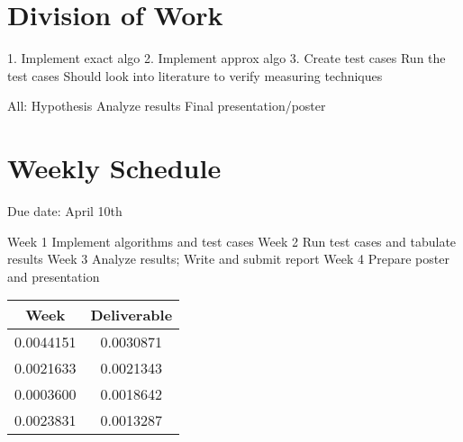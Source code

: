 \documentclass[letterpaper,12pt]{article}
\begin{document}
\section{Division of Work}

1. Implement exact algo
2. Implement approx algo
3. Create test cases
   Run the test cases
   Should look into literature to verify measuring techniques
   
 All: Hypothesis
      Analyze results
      Final presentation/poster      


\section{Weekly Schedule}
Due date: April 10th

Week 1 Implement algorithms and test cases
Week 2 Run test cases and tabulate results
Week 3 Analyze results; Write and submit report
Week 4 Prepare poster and presentation


\begin{table}[ht]
\begin{center}

\label{tbl:bins} %
\begin{tabular}{|cc|} 
\hline
\multicolumn{1}{|c}{\textbf{Week}} & \multicolumn{1}{c|}{\textbf{Deliverable}} \\
\hline
0.0044151 &   0.0030871 \\
0.0021633 &   0.0021343 \\
0.0003600 &   0.0018642 \\
0.0023831 &   0.0013287 \\
\hline
\end{tabular}
\end{center}
\end{table}
\end{document}
